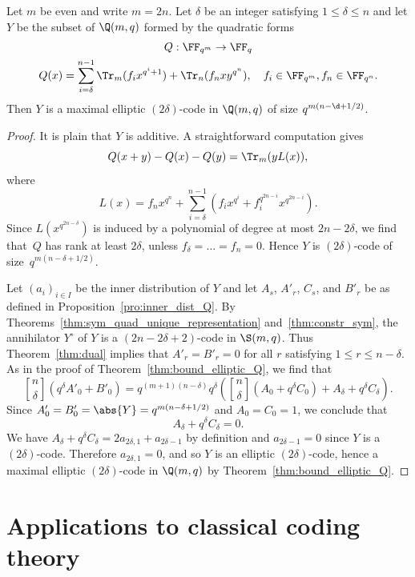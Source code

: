 \begin{theorem}
\label{thm:constr_elliptic}
Let $m$ be even and write $m=2n$. Let $\delta$ be an integer satisfying $1\le\delta\le n$ and let $Y$ be the subset of $\Q(m,q)$ formed by the quadratic forms
\begin{gather*}
Q:\FF_{q^m}\to\FF_q\\
Q(x)=\sum_{i=\delta}^{n-1}\Tr_m(f_ix^{q^i+1})+\Tr_n(f_nxy^{q^n}),\quad f_i\in\FF_{q^m},f_n\in\FF_{q^n}.
\end{gather*}
Then $Y$ is a maximal elliptic $(2\delta)$-code in $\Q(m,q)$ of size $q^{m(n-\d+1/2)}$.
\end{theorem}
\begin{proof}
It is plain that $Y$ is additive. A straightforward computation gives
\[
Q(x+y)-Q(x)-Q(y)=\Tr_m(yL(x)),
\]
where
\[
L(x)=f_nx^{q^n}+\sum_{i=\delta}^{n-1}\left(f_ix^{q^i}+f_i^{q^{2n-i}}x^{q^{2n-i}}\right).
\]
Since $L(x^{q^{2n-\delta}})$ is induced by a polynomial of degree at most $2n-2\delta$, we find that~$Q$ has rank at least $2\delta$, unless $f_\delta=\dots=f_n=0$. Hence $Y$ is $(2\delta)$-code of size~$q^{m(n-\delta+1/2)}$. 
\par
Let $(a_i)_{i\in I}$ be the inner distribution of $Y$ and let $A_s$, $A'_r$, $C_s$, and $B'_r$ be as defined in Proposition~\ref{pro:inner_dist_Q}. By Theorems~\ref{thm:sym_quad_unique_representation} and~\ref{thm:constr_sym}, the annihilator $Y^\circ$ of $Y$ is a $(2n-2\delta+2)$-code in $\S(m,q)$. Thus Theorem~\ref{thm:dual} implies that $A'_r=B'_r=0$ for all $r$ satisfying $1\le r\le n-\delta$. As in the proof of Theorem~\ref{thm:bound_elliptic_Q}, we find that
\[
\genfrac{[}{]}{0pt}{}{n}{\delta}(q^\delta A'_0+B'_0)=q^{(m+1)(n-\delta)}q^\delta\left(\genfrac{[}{]}{0pt}{}{n}{\delta}(A_0+q^\delta C_0)+A_\delta+q^\delta C_\delta\right).
\]
Since $A'_0=B'_0=\abs{Y}=q^{m(n-\delta+1/2)}$ and $A_0=C_0=1$, we conclude that
\[
A_\delta+q^\delta C_\delta=0.
\]
We have $A_\delta+q^\delta C_\delta=2a_{2\delta,1}+a_{2\delta-1}$ by definition and $a_{2\delta-1}=0$ since $Y$ is a $(2\delta)$-code. Therefore $a_{2\delta,1}=0$, and so $Y$ is an elliptic $(2\delta)$-code, hence a maximal elliptic $(2\delta)$-code in $\Q(m,q)$ by Theorem~\ref{thm:bound_elliptic_Q}.
\end{proof}

%

\section{Applications to classical coding theory}
\label{sec:applications}

